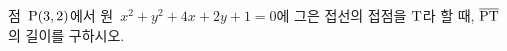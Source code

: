 점~$\mathrm{P}(3{,}\mkern3mu\mathopen{}2)$에서 원~$x^2+y^2+4x+2y+1=0$에 그은 접선의 접점을 $\mathrm{T}$라 할 때, $\overline{\mathrm{PT}}$의 길이를 구하시오.
